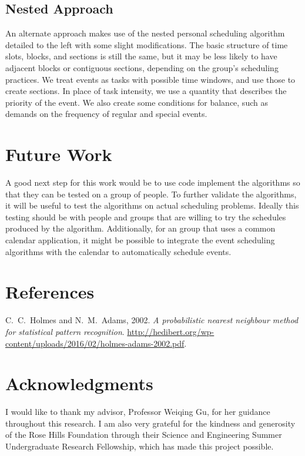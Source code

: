 \documentclass[thesis]{hmcposter}
\begin{document}
\begin{poster}
\subsection{Nested Approach}
An alternate approach makes use of the nested personal scheduling algorithm detailed to the left with some slight modifications.
The basic structure of time slots, blocks, and sections is still the same, but it may be less likely to have adjacent blocks or contiguous sections, depending on the group's scheduling practices.
We treat events as tasks with possible time windows, and use those to create sections.
In place of task intensity, we use a quantity that describes the priority of the event.
We also create some conditions for balance, such as demands on the frequency of regular and special events.


\section{Future Work}
A good next step for this work would be to use code implement the algorithms so that they can be tested on a group of people.
To further validate the algorithms, it will be useful to test the algorithms on actual scheduling problems.
Ideally this testing should be with people and groups that are willing to try the schedules produced by the algorithm.
Additionally, for an group that uses a common calendar application, it might be possible to integrate the event scheduling algorithms with the calendar to automatically schedule events.


\section{References}

%
C.~C.~Holmes and N.~M.~Adams, 2002. \emph{A probabilistic nearest neighbour method for statistical pattern recognition}. \url{http://hedibert.org/wp-content/uploads/2016/02/holmes-adams-2002.pdf}.


\section{Acknowledgments}
I would like to thank my advisor, Professor Weiqing Gu, for her guidance throughout this research.
I am also very grateful for the kindness and generosity of the Rose Hills Foundation through their Science and Engineering Summer Undergraduate Research Fellowship, which has made this project possible.


\end{poster}
\end{document}
